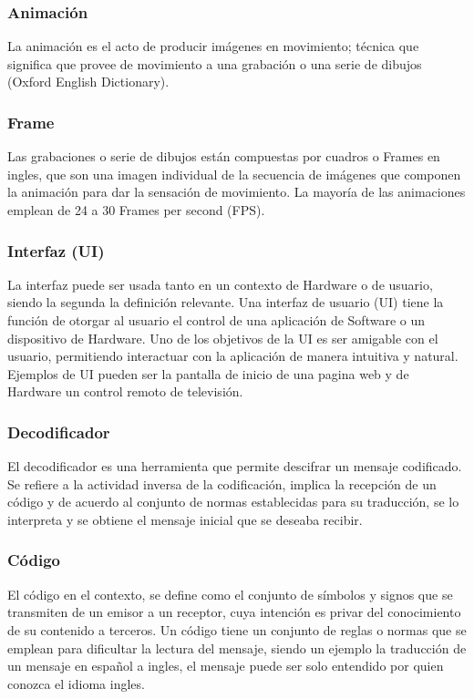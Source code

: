 \subsubsection{Animación}

La animación es el acto de producir imágenes en movimiento; técnica que significa que provee de movimiento a una grabación o una serie de dibujos (Oxford English Dictionary). 

\subsubsection{Frame}
Las grabaciones o serie de dibujos están compuestas por cuadros o Frames en ingles, que son una imagen individual de la secuencia de imágenes que componen la animación para dar la sensación de movimiento. La mayoría de las animaciones emplean de 24 a 30 Frames per second (FPS). 

\subsubsection{Interfaz (UI)}

La interfaz puede ser usada tanto en un contexto de Hardware o de usuario, siendo la segunda la definición relevante.
Una interfaz de usuario (UI) tiene la función de otorgar al usuario el control de una aplicación de Software o un dispositivo de Hardware. Uno de los objetivos de la UI es ser amigable con el usuario, permitiendo interactuar con la aplicación de manera intuitiva y natural. Ejemplos de UI pueden ser la pantalla de inicio de una pagina web y de Hardware un control remoto de televisión.

\subsubsection{Decodificador}

El decodificador es una herramienta que permite descifrar un mensaje codificado. Se refiere a la actividad inversa de la codificación, implica la recepción de un código y de acuerdo al conjunto de normas establecidas para su traducción, se lo interpreta y se obtiene el mensaje inicial que se deseaba recibir.

\subsubsection{Código}

El código en el contexto, se define como el conjunto de símbolos y signos que se transmiten de un emisor a un receptor, cuya intención es privar del conocimiento de su contenido a terceros. Un código tiene un conjunto de reglas o normas que se emplean para dificultar la lectura del mensaje, siendo un ejemplo la traducción de un mensaje en español a ingles, el mensaje puede ser solo entendido por quien conozca el idioma ingles.


